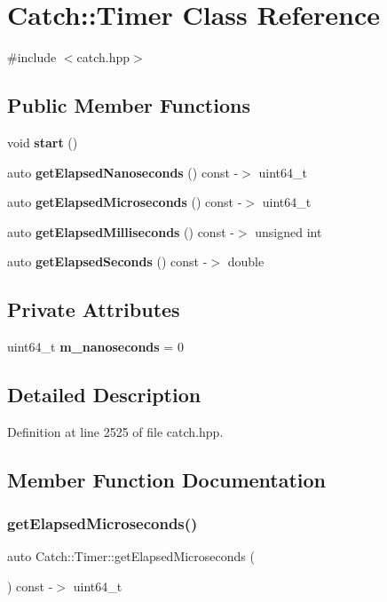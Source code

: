 \section{Catch\+::Timer Class Reference}
\label{class_catch_1_1_timer}


{\ttfamily \#include $<$catch.\+hpp$>$}

\subsection*{Public Member Functions}
\begin{DoxyCompactItemize}
\item 
void \textbf{ start} ()
\item 
auto \textbf{ get\+Elapsed\+Nanoseconds} () const -\/$>$ uint64\+\_\+t
\item 
auto \textbf{ get\+Elapsed\+Microseconds} () const -\/$>$ uint64\+\_\+t
\item 
auto \textbf{ get\+Elapsed\+Milliseconds} () const -\/$>$ unsigned int
\item 
auto \textbf{ get\+Elapsed\+Seconds} () const -\/$>$ double
\end{DoxyCompactItemize}
\subsection*{Private Attributes}
\begin{DoxyCompactItemize}
\item 
uint64\+\_\+t \textbf{ m\+\_\+nanoseconds} = 0
\end{DoxyCompactItemize}


\subsection{Detailed Description}


Definition at line 2525 of file catch.\+hpp.



\subsection{Member Function Documentation}
\mbox{\label{class_catch_1_1_timer_a545de17a61a6fee1dbe3de5b0723e5fa}} 
\subsubsection{getElapsedMicroseconds()}
{\footnotesize\ttfamily auto Catch\+::\+Timer\+::get\+Elapsed\+Microseconds (\begin{DoxyParamCaption}{ }\end{DoxyParamCaption}) const -\/$>$  uint64\+\_\+t}

